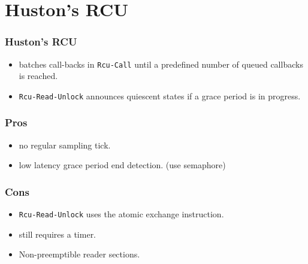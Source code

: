 \documentclass{beamer}
\begin{document}

\section{Huston's RCU}


\begin{frame}[t]
  \frametitle{Huston's RCU}

  \begin{itemize}
  \item batches call-backs in \texttt{Rcu-Call} until a predefined number
    of queued callbacks is reached.
  \item \texttt{Rcu-Read-Unlock} announces quiescent states if a grace period
    is in progress.
  \end{itemize}

\end{frame}


\begin{frame}[t]
  \frametitle{Pros}

  \begin{itemize}
  \item no regular sampling tick.
  \item low latency grace period end detection. (use semaphore)
  \end{itemize}
  
\end{frame}


\begin{frame}[t]
  \frametitle{Cons}

  \begin{itemize}
  \item \texttt{Rcu-Read-Unlock} uses the atomic exchange instruction.
  \item still requires a timer.
  \item Non-preemptible reader sections.
  \end{itemize}
  
\end{frame}

\end{document}
